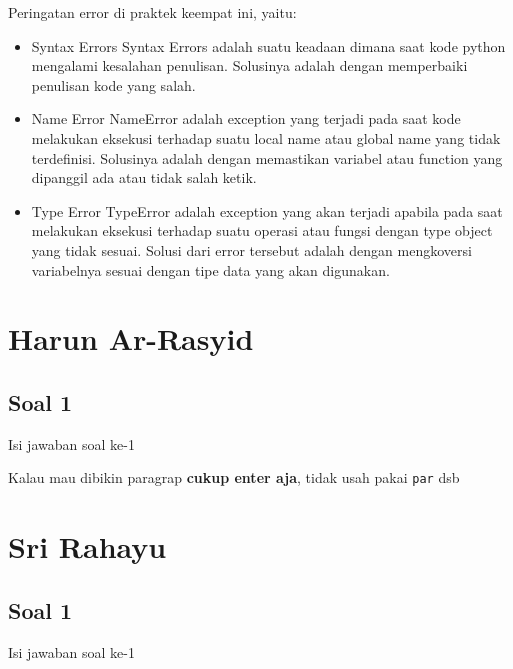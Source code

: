 Peringatan error di praktek keempat ini, yaitu:
\begin{itemize}
	\item Syntax Errors
	Syntax Errors adalah suatu keadaan dimana saat kode python mengalami kesalahan penulisan. Solusinya adalah dengan memperbaiki penulisan kode yang salah.
	
	\item Name Error
	NameError adalah exception yang terjadi pada saat kode melakukan eksekusi terhadap suatu local name atau global name yang tidak terdefinisi. Solusinya adalah dengan memastikan variabel atau function yang dipanggil ada atau tidak salah ketik.
	
	\item Type Error
	TypeError adalah exception yang akan terjadi apabila pada saat melakukan eksekusi terhadap suatu operasi atau fungsi dengan type object yang tidak sesuai. Solusi dari error tersebut adalah dengan mengkoversi variabelnya sesuai dengan tipe data yang akan digunakan.
\end{itemize}



\section{Harun Ar-Rasyid}
\subsection{Soal 1}
Isi jawaban soal ke-1

Kalau mau dibikin paragrap \textbf{cukup enter aja}, tidak usah pakai \verb|par| dsb



\section{Sri Rahayu}
\subsection{Soal 1}
Isi jawaban soal ke-1

